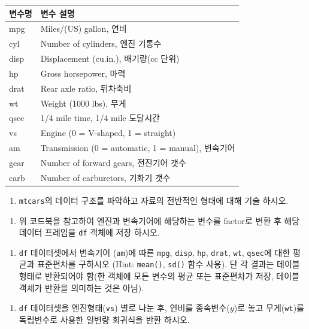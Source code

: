 \documentclass[
  11pt,
]{krantz}
\providecommand{\tightlist}{%
  \setlength{\itemsep}{0pt}\setlength{\parskip}{0pt}}
\begin{document}
\begin{tabular}{l|l}
\hline
변수명 & 변수 설명\\
\hline
mpg & Miles/(US) gallon, 연비\\
\hline
cyl & Number of cylinders, 엔진 기통수\\
\hline
disp & Displacement (cu.in.), 배기량(cc 단위)\\
\hline
hp & Gross horsepower, 마력\\
\hline
drat & Rear axle ratio, 뒤차축비\\
\hline
wt & Weight (1000 lbs), 무게\\
\hline
qsec & 1/4 mile time, 1/4 mile 도달시간\\
\hline
vs & Engine (0 = V-shaped, 1 = straight)\\
\hline
am & Transmission (0 = automatic, 1 = manual), 변속기어\\
\hline
gear & Number of forward gears, 전진기어 갯수\\
\hline
carb & Number of carburetors, 기화기 갯수\\
\hline
\end{tabular}

\normalsize

\begin{enumerate}
\def\labelenumi{\alph{enumi})}
\tightlist
\item
  \texttt{mtcars}의 데이터 구조를 파악하고 자료의 전반적인 형태에 대해 기술 하시오.
\end{enumerate}

\begin{enumerate}
\def\labelenumi{\alph{enumi})}
\setcounter{enumi}{1}
\tightlist
\item
  위 코드북을 참고하여 엔진과 변속기어에 해당하는 변수를 factor로 변환 후 해당 데이터 프레임을 \texttt{df} 객체에 저장 하시오.
\end{enumerate}

\begin{enumerate}
\def\labelenumi{\alph{enumi})}
\setcounter{enumi}{2}
\tightlist
\item
  \texttt{df} 데이터셋에서 변속기어 (\texttt{am})에 따른 \texttt{mpg}, \texttt{disp}, \texttt{hp}, \texttt{drat}, \texttt{wt}, \texttt{qsec}에 대한 평균과 표준편차를 구하시오 (Hint: \texttt{mean()}, \texttt{sd()} 함수 사용). 단 각 결과는 테이블 형태로 반환되어야 함(한 객체에 모든 변수의 평균 또는 표준편차가 저장, 테이블 객체가 반환을 의미하는 것은 아님).
\end{enumerate}

\begin{enumerate}
\def\labelenumi{\alph{enumi})}
\setcounter{enumi}{3}
\tightlist
\item
  \texttt{df} 데이터셋을 엔진형태(\texttt{vs}) 별로 나눈 후, 연비를 종속변수(\(y\))로 놓고 무게(\texttt{wt})를 독립변수로 사용한 일변량 회귀식을 반환 하시오.
\end{enumerate}
\end{document}
